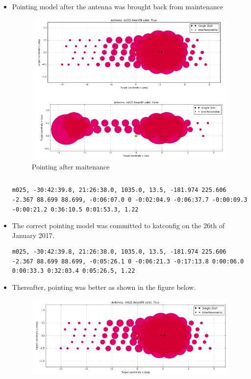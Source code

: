\documentclass{article}
\begin{document}
{\begin{appendices}
\begin{itemize}
\item Pointing model after the antenna was brought back from maintenance
\begin{figure}[H]
	\centering
	\includegraphics[scale=0.33]{m025_after2.png}
	
	\caption{Pointing after maitenance}
	\label{fig:tilt7}
\end{figure}
\begin{lstlisting}

\end{lstlisting}
\begin{verbatim}
m025, -30:42:39.8, 21:26:38.0, 1035.0, 13.5, -181.974 225.606 -2.367 88.699 88.699, -0:06:07.0 0 -0:02:04.9 -0:06:37.7 -0:00:09.3 -0:00:21.2 0:36:10.5 0:01:53.3, 1.22
\end{verbatim}

\item The correct pointing model was committed to katconfig on the 26th of January 2017. 
\begin{lstlisting}
m025, -30:42:39.8, 21:26:38.0, 1035.0, 13.5, -181.974 225.606 -2.367 88.699 88.699, -0:05:26.1 0 -0:06:21.3 -0:17:13.8 0:00:06.0 0:00:33.3 0:32:03.4 0:05:26.5, 1.22
\end{lstlisting}



\item Thereafter, pointing was better as shown in the figure below.

\begin{figure}[H]
	\centering
	\includegraphics[scale=0.33]{m025_after.png}
	

\end{figure}
\end{itemize}
\end{appendices}}
\end{document}
